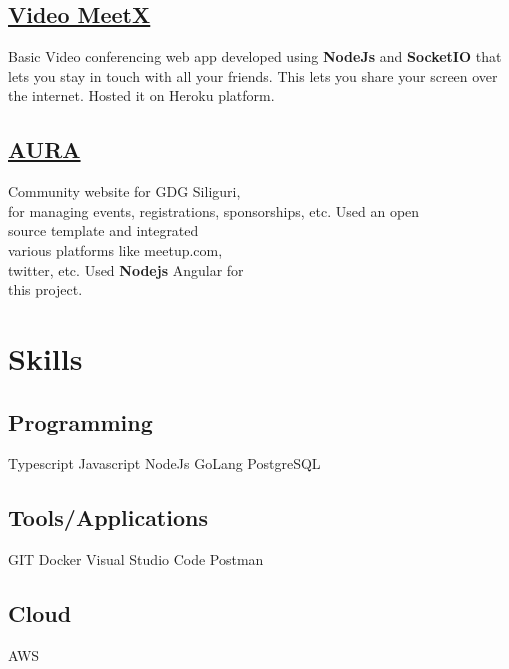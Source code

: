 \documentclass[letterpaper]{deedy-resume} %
\begin{document}
\begin{minipage}[t]{0.33\textwidth}

\subsection{\href{https://video-meetx.herokuapp.com/}{Video MeetX}}
Basic Video conferencing web app developed using \textbf{NodeJs} and \textbf{SocketIO} that lets you stay in touch with all your friends. This lets you share your screen over the internet. Hosted it on Heroku platform.
\sectionspace

\subsection{\href{https://github.com/abhinav580/aura}{AURA}}
Community website for GDG Siliguri, \\ for managing events, registrations, sponsorships, etc. Used an open \\ source template and integrated \\ various  platforms like meetup.com,\\ twitter, etc. Used \textbf{Nodejs}  Angular for \\ this project.
\sectionspace %


\section{Skills}

\subsection{Programming}

Typescript \textbullet{} Javascript \textbullet{} NodeJs \textbullet{} GoLang \textbullet{} PostgreSQL \newline


\subsection{Tools/Applications}
GIT \textbullet{} Docker \textbullet{} Visual Studio Code \textbullet{} Postman

\sectionspace
\subsection{Cloud}
AWS


\end{minipage}
\end{document}
